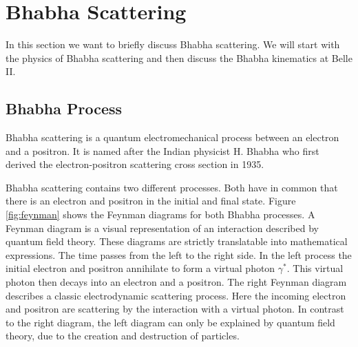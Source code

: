 \documentclass[a4paper,11pt,twosided,final,german,openbib,pdftex,listof=totoc,bibliography=totoc]{scrbook}
\begin{document}
\section{Bhabha Scattering}
\label{sec:Bhabha}

In this section we want to briefly discuss Bhabha scattering. We will start with the physics of Bhabha scattering and then discuss the Bhabha kinematics at Belle II.
 
\subsection{Bhabha Process}
 \label{sec:BhabhaProcess}
 Bhabha scattering is a quantum electromechanical process between an electron and a positron. It is named after the Indian  physicist H. Bhabha who first derived the electron-positron scattering cross section in 1935.\cite{Bhabha}
 
Bhabha scattering contains two different processes. Both have in common that there is an electron and positron in the initial and final state. Figure \ref{fig:feynman} shows the Feynman diagrams for both Bhabha processes. 
A Feynman diagram is a visual representation of an interaction described by quantum field theory. These diagrams are strictly translatable into mathematical expressions.
The time passes from the left to the right side. In the left process the initial electron and positron annihilate to form a virtual photon $\gamma^\ast$. This virtual photon then decays into an electron and a positron. The right Feynman diagram describes a classic electrodynamic scattering process. Here the incoming electron and positron are scattering by the interaction with a virtual photon. In contrast to the right diagram, the left diagram can only be explained by quantum field theory, due to the creation and destruction of particles.
 

\end{document}
